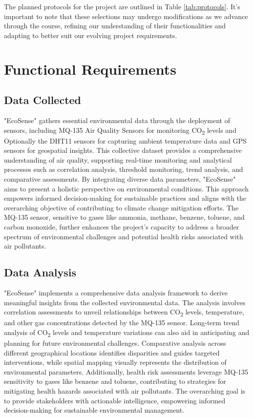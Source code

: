 \documentclass[conference]{IEEEtran}
\begin{document}
The planned protocols for the project are outlined in Table \ref{tab:protocols}. It's important to note that these selections may undergo modifications as we advance through the course, refining our understanding of their functionalities and adapting to better suit our evolving project requirements.

\section{Functional Requirements}

\subsection{Data Collected}

 "EcoSense" gathers essential environmental data through the deployment of sensors, including MQ-135 Air Quality Sensors for monitoring CO\textsubscript{2} levels and Optionally the DHT11 sensors for capturing ambient temperature data and GPS sensors for geospatial insights. This collective dataset provides a comprehensive understanding of air quality, supporting real-time monitoring and analytical processes such as correlation analysis, threshold monitoring, trend analysis, and comparative assessments. By integrating diverse data parameters, "EcoSense" aims to present a holistic perspective on environmental conditions. This approach empowers informed decision-making for sustainable practices and aligns with the overarching objective of contributing to climate change mitigation efforts. The MQ-135 sensor, sensitive to gases like ammonia, methane, benzene, toluene, and carbon monoxide, further enhances the project's capacity to address a broader spectrum of environmental challenges and potential health risks associated with air pollutants.

\subsection{Data Analysis}

"EcoSense" implements a comprehensive data analysis framework to derive meaningful insights from the collected environmental data. The analysis involves correlation assessments to unveil relationships between CO\textsubscript{2} levels, temperature, and other gas concentrations detected by the MQ-135 sensor. Long-term trend analysis of CO\textsubscript{2} levels and temperature variations can also aid in anticipating and planning for future environmental challenges. Comparative analysis across different geographical locations identifies disparities and guides targeted interventions, while spatial mapping visually represents the distribution of environmental parameters. Additionally, health risk assessments leverage MQ-135 sensitivity to gases like benzene and toluene, contributing to strategies for mitigating health hazards associated with air pollutants. The overarching goal is to provide stakeholders with actionable intelligence, empowering informed decision-making for sustainable environmental management.
\end{document}
